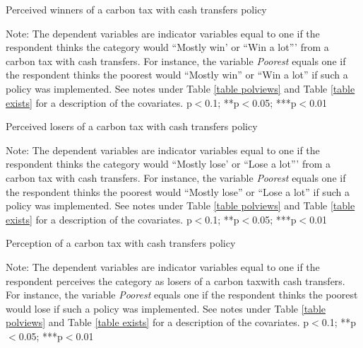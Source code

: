 \documentclass{article}
\begin{document}
\begin{table}[h!]
	\caption{Perceived winners of a carbon tax with cash transfers policy}
	\begin{center}
		\scalebox{0.7}{}
	\end{center}
	{\footnotesize Note: The dependent variables are indicator variables equal to one if the respondent thinks the category would ``Mostly win' or ``Win a lot''' from a carbon tax with cash transfers. For instance, the variable \textit{Poorest} equals one if the respondent thinks the poorest would ``Mostly win'' or ``Win a lot'' if such a policy was implemented. See notes under Table \ref{table polviews} and Table \ref{table exists} for a description of the covariates.
	\newline *p$<$0.1; **p$<$0.05; ***p$<$0.01}
\end{table}	

\begin{table}[h!]
	\caption{Perceived losers of a carbon tax with cash transfers policy}
	\begin{center}
		\scalebox{0.7}{}
	\end{center}
	{\footnotesize Note: The dependent variables are indicator variables equal to one if the respondent thinks the category would ``Mostly lose' or ``Lose a lot''' from a carbon tax with cash transfers. For instance, the variable \textit{Poorest} equals one if the respondent thinks the poorest would ``Mostly lose'' or ``Lose a lot'' if such a policy was implemented. See notes under Table \ref{table polviews} and Table \ref{table exists} for a description of the covariates.
	\newline *p$<$0.1; **p$<$0.05; ***p$<$0.01}
\end{table}	

\begin{table}[h!]
	\caption{Perception of a carbon tax with cash transfers policy}
	\begin{center}
		\scalebox{0.7}{}
	\end{center}
	{\footnotesize Note: The dependent variables are indicator variables equal to one if the respondent perceives the category as losers of a carbon taxwith cash transfers. For instance, the variable \textit{Poorest} equals one if the respondent thinks the poorest would lose if such a policy was implemented. See notes under Table \ref{table polviews} and Table \ref{table exists} for a description of the covariates.
	\newline *p$<$0.1; **p$<$0.05; ***p$<$0.01}
\end{table}	
\end{document}
